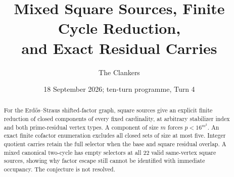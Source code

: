 \documentclass[11pt,reqno]{amsart}
\title{Mixed Square Sources, Finite Cycle Reduction,\\and Exact Residual Carries}
\author{The Clankers}\date{18 September 2026; ten-turn programme, Turn 4}
\begin{document}
\begin{abstract}
For the Erd\H{o}s--Straus shifted-factor graph, square sources give an explicit
finite reduction of closed components of every fixed cardinality, at arbitrary
stabilizer index and both prime-residual vertex types. A component of size $m$
forces $p<16^{m^2}$. An exact finite cofactor enumeration excludes all closed
sets of size at most five. Integer quotient carries retain the full selector when
the base and square residual overlap. A mixed canonical two-cycle has empty
selectors at all 22 valid same-vertex square sources, showing why factor escape
still cannot be identified with immediate occupancy. The conjecture is not resolved.
\end{abstract}\maketitle

\end{document}
